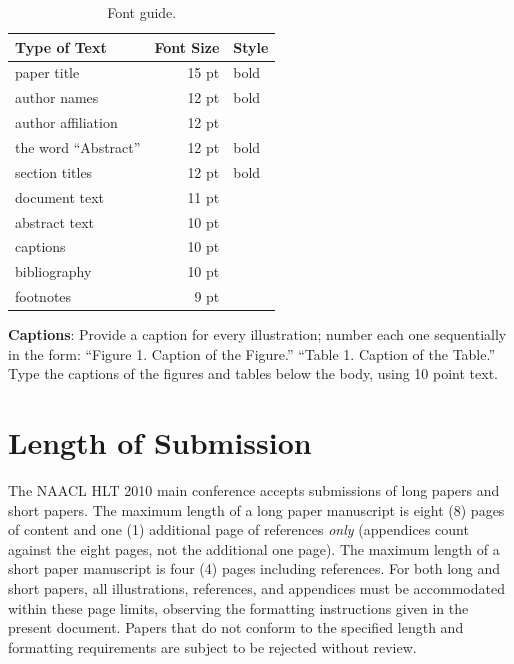 \documentclass[11pt,letterpaper]{article}
\begin{document}
\begin{table}
\begin{center}
\begin{tabular}{|l|rl|}
\hline \bf Type of Text & \bf Font Size & \bf Style \\ \hline
paper title & 15 pt & bold \\
author names & 12 pt & bold \\
author affiliation & 12 pt & \\
the word ``Abstract'' & 12 pt & bold \\
section titles & 12 pt & bold \\
document text & 11 pt  &\\
abstract text & 10 pt & \\
captions & 10 pt & \\
bibliography & 10 pt & \\
footnotes & 9 pt & \\
\hline
\end{tabular}
\end{center}
\caption{\label{font-table} Font guide. }
\end{table}

{\bf Captions}: Provide a caption for every illustration; number each one
sequentially in the form:  ``Figure 1. Caption of the Figure.'' ``Table 1.
Caption of the Table.''  Type the captions of the figures and 
tables below the body, using 10 point text.  

\section{Length of Submission}
\label{sec:length}

The NAACL HLT 2010 main conference accepts submissions of long papers
and short papers.  The maximum length of a long paper manuscript is
eight (8) pages of content and one (1) additional page of references
\emph{only} (appendices count against the eight pages, not the
additional one page).  The maximum length of a short paper manuscript
is four (4) pages including references.  For both long and short
papers, all illustrations, references, and appendices must be
accommodated within these page limits, observing the formatting
instructions given in the present document.  Papers that do not
conform to the specified length and formatting requirements are
subject to be rejected without review.

\end{document}
